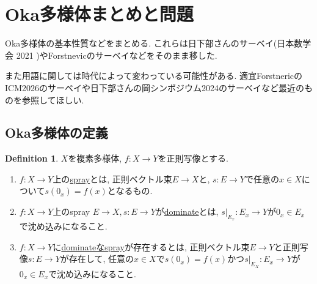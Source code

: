 \documentclass[dvipdfmx,a4paper,11pt]{article} %
\theoremstyle{definition}
\newtheorem{defn}[thm]{Definition}
\theoremstyle{remark}
\numberwithin{equation}{section}
\begin{document}
\newpage
\section{Oka多様体まとめと問題}
Oka多様体の基本性質などをまとめる. 
これらは日下部さんのサーベイ(日本数学会 2021 \cite{Kus21})やForstnevicのサーベイ\cite{For13}などをそのまま移した.

また用語に関しては時代によって変わっている可能性がある. 適宜ForstnericのICM2026のサーベイや日下部さんの岡シンポジウム2024のサーベイなど最近のものを参照してほしい. 

\subsection{Oka多様体の定義}
\begin{defn}
$X$を複素多様体, $f : X \to Y$を正則写像とする.
\begin{enumerate}
\item $f : X \to Y$上の\underline{spray}とは, 正則ベクトル束$E \to X$と, $s : E\to Y$で任意の$x \in X$について$s(0_x)=f(x)$となるもの.
\item $f : X \to Y$上のspray $E \to X, s:E \to Y$が\underline{dominate}とは, $s|_{E_x} : E_x \to Y$が$0_x \in E_x$で沈め込みになること.
\item $f :  X \to Y$に\underline{dominateなspray}が存在するとは, 正則ベクトル束$E \to Y$と正則写像$s:E \to Y$が存在して, 任意の$x \in X$で$s(0_x)=f(x)$かつ$s|_{E_X} : E_x \to Y$が$0_x \in E_x$で沈め込みになること.
\end{enumerate}
\end{defn}
\end{document}
